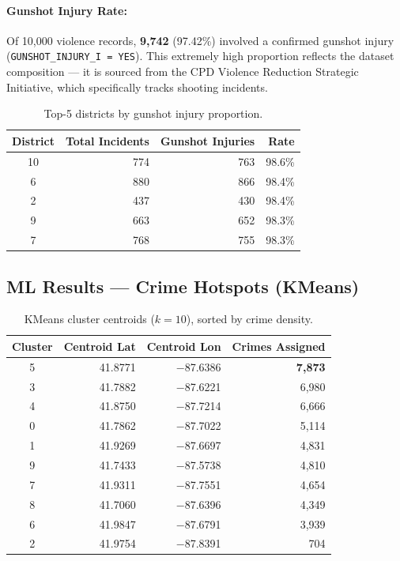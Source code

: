 \documentclass[11pt,a4paper]{article}
\begin{document}
\paragraph{Gunshot Injury Rate:}
Of 10{,}000 violence records, \textbf{9{,}742} (97.42\%) involved a
confirmed gunshot injury (\texttt{GUNSHOT\_INJURY\_I = YES}). This
extremely high proportion reflects the dataset composition — it is
sourced from the CPD Violence Reduction Strategic Initiative, which
specifically tracks shooting incidents.

\begin{table}[H]
\centering
\caption{Top-5 districts by gunshot injury proportion.}
\label{tab:gunshot}
\begin{tabular}{@{}crrr@{}}
\toprule
\textbf{District} & \textbf{Total Incidents} & \textbf{Gunshot Injuries} & \textbf{Rate} \\
\midrule
10 & 774 & 763 & 98.6\% \\
 6 & 880 & 866 & 98.4\% \\
 2 & 437 & 430 & 98.4\% \\
 9 & 663 & 652 & 98.3\% \\
 7 & 768 & 755 & 98.3\% \\
\bottomrule
\end{tabular}
\end{table}

\subsection{ML Results — Crime Hotspots (KMeans)}

\begin{table}[H]
\centering
\caption{KMeans cluster centroids ($k=10$), sorted by crime density.}
\label{tab:hotspots}
\begin{tabular}{@{}crrr@{}}
\toprule
\textbf{Cluster} & \textbf{Centroid Lat} & \textbf{Centroid Lon} & \textbf{Crimes Assigned} \\
\midrule
5 & 41.8771 & $-$87.6386 & \textbf{7{,}873} \\
3 & 41.7882 & $-$87.6221 & 6{,}980 \\
4 & 41.8750 & $-$87.7214 & 6{,}666 \\
0 & 41.7862 & $-$87.7022 & 5{,}114 \\
1 & 41.9269 & $-$87.6697 & 4{,}831 \\
9 & 41.7433 & $-$87.5738 & 4{,}810 \\
7 & 41.9311 & $-$87.7551 & 4{,}654 \\
8 & 41.7060 & $-$87.6396 & 4{,}349 \\
6 & 41.9847 & $-$87.6791 & 3{,}939 \\
2 & 41.9754 & $-$87.8391 &   704 \\
\bottomrule
\end{tabular}
\end{table}
\end{document}
